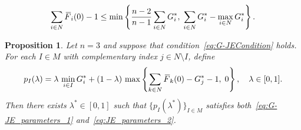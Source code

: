 \documentclass[10pt,a4paper]{amsart}
\newtheorem{proposition}{Proposition}
\newcommand{\F}{\,\overline{\kern-0.175em F\kern-0em}}
\newcommand{\I}{{I}}
\newcommand{\M}{{M}}
\newcommand{\N}{{N}}
\begin{document}
\begin{equation}
\label{eq:G-JECondition}
\sum_{i\in\N}\F_i(0)-1
\le \min\left\{\frac{n-2}{n-1}\sum_{i\in\N}G_i^*,\;
\sum_{i\in\N}G_i^*-\max_{i\in\N}G_i^*\right\}.
\end{equation}

\begin{proposition}
\label{prop:G-JE_trivariate}
Let $n=3$ and suppose that condition~\eqref{eq:G-JECondition} holds. For each
$\I\in\M$ with complementary index $j\in\N\setminus\I$, define
\begin{equation}
\label{eq:G-JE_trivariate_P}
p_{\I}(\lambda)
=\lambda\,\min_{i\in\I}G_i^*
+(1-\lambda)\,\max\left\{\sum_{k\in\N}\F_k(0)-G_j^*-1,\;0\right\},
\quad\lambda\in[0,1].
\end{equation}
Then there exists $\lambda^*\in[0,1]$ such that $\{p_\I(\lambda^*)\}_{\I\in\M}$
satisfies both~\eqref{eq:G-JE_parameters_1} and~\eqref{eq:JE_parameters_2}.
\end{proposition}
\end{document}
